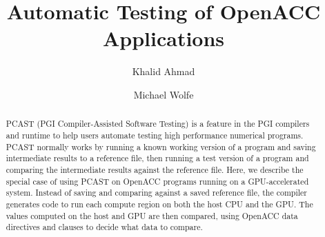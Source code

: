 \documentclass{llncs}
\begin{document}
\title{Automatic Testing of OpenACC Applications}
%
%
\author{Khalid Ahmad \and Michael Wolfe}
%
%
%

\maketitle              %

\begin{abstract}
PCAST (PGI Compiler-Assisted Software Testing) is a feature in the PGI compilers and runtime to help users automate testing high performance numerical programs.
PCAST normally works by running a known working version of a program and saving intermediate results to a reference file, then running a test version of a program and comparing the intermediate results against the reference file.
Here, we describe the special case of using PCAST on OpenACC programs running on a GPU-accelerated system.
Instead of saving and comparing against a saved reference file, the compiler generates code to run each compute region on both the host CPU and the GPU.
The values computed on the host and GPU are then compared, using OpenACC data directives and clauses to decide what data to compare.
\end{abstract}
%









%


\end{document}
